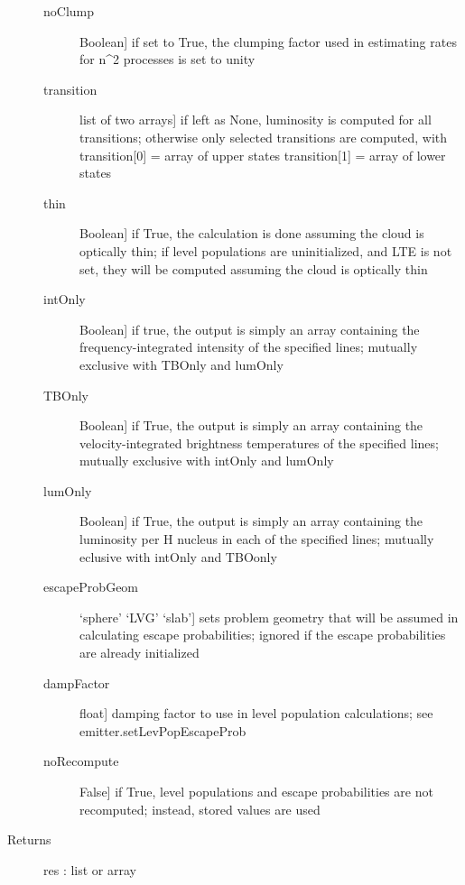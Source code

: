\documentclass[letterpaper,10pt,english]{sphinxmanual}
\begin{document}
\begin{fulllineitems}
\begin{fulllineitems}
\begin{description}
\begin{description}
\item[{noClump}] \leavevmode{[}Boolean{]}
if set to True, the clumping factor used in estimating
rates for n\textasciicircum{}2 processes is set to unity

\item[{transition}] \leavevmode{[}list of two arrays{]}
if left as None, luminosity is computed for all
transitions; otherwise only selected transitions are
computed, with transition{[}0{]} = array of upper states
transition{[}1{]} = array of lower states

\item[{thin}] \leavevmode{[}Boolean{]}
if True, the calculation is done assuming the cloud is
optically thin; if level populations are uninitialized,
and LTE is not set, they will be computed assuming the
cloud is optically thin

\item[{intOnly}] \leavevmode{[}Boolean{]}
if true, the output is simply an array containing the
frequency-integrated intensity of the specified lines;
mutually exclusive with TBOnly and lumOnly

\item[{TBOnly}] \leavevmode{[}Boolean{]}
if True, the output is simply an array containing the
velocity-integrated brightness temperatures of the
specified lines; mutually exclusive with intOnly and
lumOnly

\item[{lumOnly}] \leavevmode{[}Boolean{]}
if True, the output is simply an array containing the
luminosity per H nucleus in each of the specified lines;
mutually eclusive with intOnly and TBOonly

\item[{escapeProbGeom}] \leavevmode{[}`sphere' \textbar{} `LVG' \textbar{} `slab'{]}
sets problem geometry that will be assumed in calculating
escape probabilities; ignored if the escape probabilities
are already initialized

\item[{dampFactor}] \leavevmode{[}float{]}
damping factor to use in level population calculations;
see emitter.setLevPopEscapeProb

\item[{noRecompute}] \leavevmode{[}False{]}
if True, level populations and escape probabilities are
not recomputed; instead, stored values are used

\end{description}

\item[{Returns}] \leavevmode
res : list or array


\end{description}
\end{fulllineitems}
\end{fulllineitems}
\end{document}
